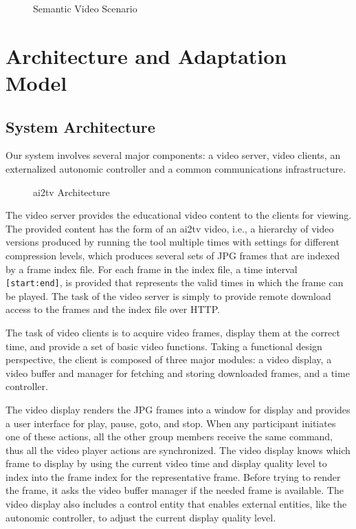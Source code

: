 \documentclass{sig-alternate}
\begin{document}
\begin{figure}
  \centering
  \caption{Semantic Video Scenario}
  \label{vidframes}
\end{figure} 


\section{Architecture and Adaptation Model}
\subsection{System Architecture}
Our system involves several major components: a video server, video
clients, an externalized autonomic controller and a common
communications infrastructure.

\begin{figure}
  \centering
  \caption{ai2tv Architecture}
  \label{ai2tv_arch}
\end{figure}

The video server provides the educational video content to the clients
for viewing.  The provided content has the form of an ai2tv video,
i.e., a hierarchy of video versions produced by running the tool
multiple times with settings for different compression levels, which
produces several sets of JPG frames that are indexed by a frame index
file.  For each frame in the index file, a time interval
\texttt{[start:end]}, is provided that represents the valid times in
which the frame can be played.  The task of the video server is simply
to provide remote download access to the frames and the index file
over HTTP.

The task of video clients is to acquire video frames, display them at
the correct time, and provide a set of basic video functions.  Taking
a functional design perspective, the client is composed of three major
modules: a video display, a video buffer and manager for fetching and
storing downloaded frames, and a time controller.

The video display renders the JPG frames into a window for display and
provides a user interface for play, pause, goto, and stop.  When any
participant initiates one of these actions, all the other group
members receive the same command, thus all the video player actions
are synchronized.  The video display knows which frame to display by
using the current video time and display quality level to index into
the frame index for the representative frame.  Before trying to render
the frame, it asks the video buffer manager if the needed frame is
available.  The video display also includes a control entity that
enables external entities, like the autonomic controller, to adjust
the current display quality level.
\end{document}
